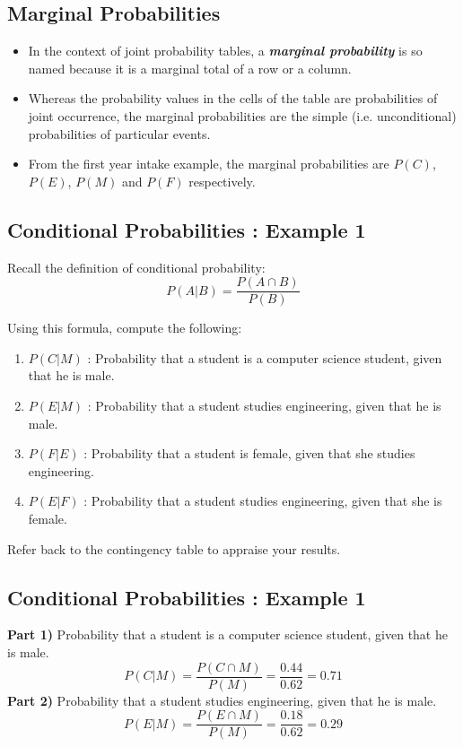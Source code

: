 \documentclass[]{report}
\begin{document}
{{	\subsection{Marginal Probabilities}
	\begin{itemize}
		\item In the context of joint probability tables, a  \textbf{\emph{marginal probability}} is so named because it is a marginal total of
		a row or a column. \item Whereas the probability values in the cells of the table are probabilities of joint occurrence, the marginal
		probabilities are the simple (i.e. unconditional) probabilities of particular events.
		\item From the first year intake example, the marginal probabilities are $P(C)$, $P(E)$, $P(M)$ and $P(F)$ respectively.
	\end{itemize}
	
}
{
	\subsection{Conditional Probabilities : Example 1}
	
	Recall the definition of conditional probability:
	\[ P(A|B) = \frac{P(A \cap B)}{P(B)} \]
	
	Using this formula, compute the following:
	\begin{enumerate}
		\item $P(C|M)$ : Probability that a student is a computer science student, given that he is male.
		\item $P(E|M)$ : Probability that a student studies engineering, given that he is male.
		\item $P(F|E)$ : Probability that a student is female, given that she studies engineering.
		\item $P(E|F)$ : Probability that a student studies engineering, given that she is female.
	\end{enumerate}
	Refer back to the contingency table to appraise your results.
}
{
	\subsection{Conditional Probabilities : Example 1}
	
	\textbf{Part 1)} Probability that a student is a computer science student, given that he is male.
	\[ P(C|M) = \frac{P(C \cap M)}{P(M)}  = \frac{0.44}{0.62} = 0.71 \]
	\textbf{Part 2)} Probability that a student studies engineering, given that he is male.
	\[ P(E|M) = \frac{P(E \cap M)}{P(M)}  = \frac{0.18}{0.62} = 0.29 \]
	
}}
\end{document}
